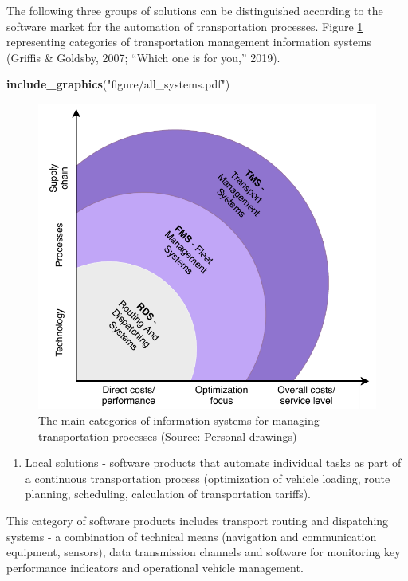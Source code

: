\documentclass[12pt,twoside]{reedthesis}
\newenvironment{Shaded}{\begin{snugshade}}{\end{snugshade}}
\newcommand{\KeywordTok}[1]{\textcolor[rgb]{0.13,0.29,0.53}{\textbf{#1}}}
\newcommand{\NormalTok}[1]{#1}
\newcommand{\StringTok}[1]{\textcolor[rgb]{0.31,0.60,0.02}{#1}}
\providecommand{\tightlist}{%
  \setlength{\itemsep}{0pt}\setlength{\parskip}{0pt}}
\begin{document}
The following three groups of solutions can be distinguished according to the software market for the automation of transportation processes. Figure \ref{fig:tmssystems} representing categories of transportation management information systems (Griffis \& Goldsby, 2007; ``Which one is for you,'' 2019).
\begin{Shaded}
\begin{Highlighting}[]
\KeywordTok{include_graphics}\NormalTok{(}\StringTok{"figure/all_systems.pdf"}\NormalTok{)}
\end{Highlighting}
\end{Shaded}
\begin{figure}[h]

{\centering \includegraphics[width=0.9\linewidth,]{figure/all_systems} 

}

\caption{The main categories of information systems for managing transportation processes (Source: Personal drawings)}\label{fig:tmssystems}
\end{figure}
\begin{enumerate}
\def\labelenumi{\arabic{enumi}.}
\tightlist
\item
  Local solutions - software products that automate individual tasks as part of a continuous transportation process (optimization of vehicle loading, route planning, scheduling, calculation of transportation tariffs).
\end{enumerate}
This category of software products includes transport routing and dispatching systems - a combination of technical means (navigation and communication equipment, sensors), data transmission channels and software for monitoring key performance indicators and operational vehicle management.
\end{document}
